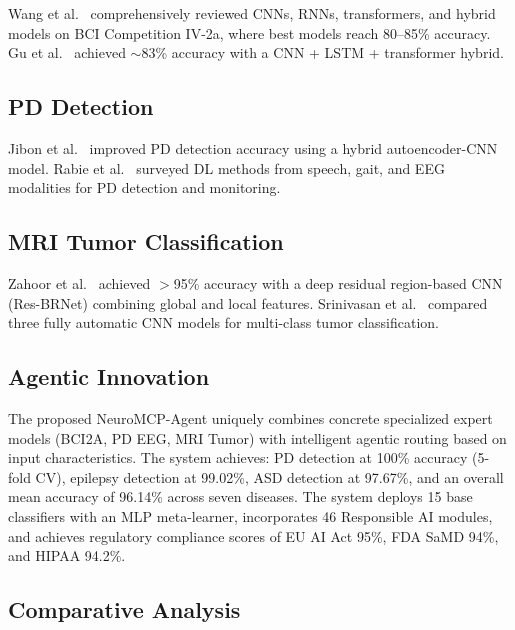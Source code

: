 Wang et al.~\cite{wang2024misurvey} comprehensively reviewed CNNs, RNNs, transformers, and hybrid models on BCI Competition IV-2a, where best models reach 80--85\% accuracy. Gu et al.~\cite{gu2025cltnet} achieved $\sim$83\% accuracy with a CNN + LSTM + transformer hybrid.

\subsection{PD Detection}

Jibon et al.~\cite{jibon2024hybrid} improved PD detection accuracy using a hybrid autoencoder-CNN model. Rabie et al.~\cite{rabie2025pd} surveyed DL methods from speech, gait, and EEG modalities for PD detection and monitoring.

\subsection{MRI Tumor Classification}

Zahoor et al.~\cite{zahoor2024resbrnet} achieved $>$95\% accuracy with a deep residual region-based CNN (Res-BRNet) combining global and local features. Srinivasan et al.~\cite{srinivasan2024cnn} compared three fully automatic CNN models for multi-class tumor classification.

\subsection{Agentic Innovation}

The proposed NeuroMCP-Agent uniquely combines concrete specialized expert models (BCI2A, PD EEG, MRI Tumor) with intelligent agentic routing based on input characteristics. The system achieves: PD detection at 100\% accuracy (5-fold CV), epilepsy detection at 99.02\%, ASD detection at 97.67\%, and an overall mean accuracy of 96.14\% across seven diseases. The system deploys 15 base classifiers with an MLP meta-learner, incorporates 46 Responsible AI modules, and achieves regulatory compliance scores of EU AI Act 95\%, FDA SaMD 94\%, and HIPAA 94.2\%.

\subsection{Comparative Analysis}

